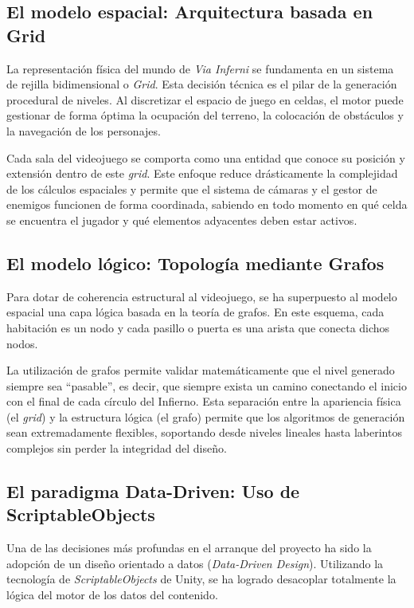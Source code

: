 \subsection{El modelo espacial: Arquitectura basada en Grid}
La representación física del mundo de \textit{Via Inferni} se fundamenta en un sistema de rejilla bidimensional o \textit{Grid}. Esta decisión técnica es el pilar de la generación procedural de niveles. Al discretizar el espacio de juego en celdas, el motor puede gestionar de forma óptima la ocupación del terreno, la colocación de obstáculos y la navegación de los personajes.

Cada sala del videojuego se comporta como una entidad que conoce su posición y extensión dentro de este \textit{grid}. Este enfoque reduce drásticamente la complejidad de los cálculos espaciales y permite que el sistema de cámaras y el gestor de enemigos funcionen de forma coordinada, sabiendo en todo momento en qué celda se encuentra el jugador y qué elementos adyacentes deben estar activos.

\subsection{El modelo lógico: Topología mediante Grafos}
Para dotar de coherencia estructural al videojuego, se ha superpuesto al modelo espacial una capa lógica basada en la teoría de grafos. En este esquema, cada habitación es un nodo y cada pasillo o puerta es una arista que conecta dichos nodos.

La utilización de grafos permite validar matemáticamente que el nivel generado siempre sea ``pasable'', es decir, que siempre exista un camino conectando el inicio con el final de cada círculo del Infierno. Esta separación entre la apariencia física (el \textit{grid}) y la estructura lógica (el grafo) permite que los algoritmos de generación sean extremadamente flexibles, soportando desde niveles lineales hasta laberintos complejos sin perder la integridad del diseño.

\subsection{El paradigma Data-Driven: Uso de ScriptableObjects}
Una de las decisiones más profundas en el arranque del proyecto ha sido la adopción de un diseño orientado a datos (\textit{Data-Driven Design}). Utilizando la tecnología de \textit{ScriptableObjects} de Unity, se ha logrado desacoplar totalmente la lógica del motor de los datos del contenido.

